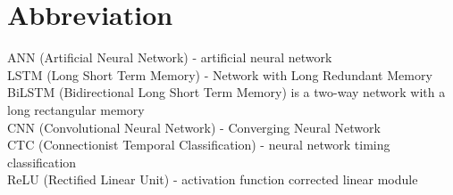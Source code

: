 \chapter*{Abbreviation}							%


\noindent ANN (Artificial Neural Network) - artificial neural network \\
LSTM (Long Short Term Memory) - Network with Long Redundant Memory \\
BiLSTM (Bidirectional Long Short Term Memory) is a two-way network with a long rectangular memory \\
CNN (Convolutional Neural Network) - Converging Neural Network \\
CTC (Connectionist Temporal Classification) - neural network timing classification \\
ReLU (Rectified Linear Unit) - activation function corrected linear module \\

